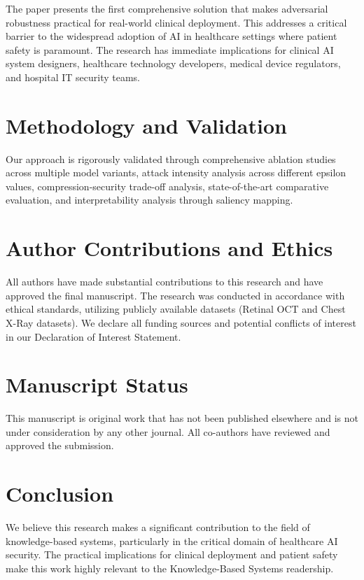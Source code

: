 \documentclass[12pt]{article}
\begin{document}
The paper presents the first comprehensive solution that makes adversarial robustness practical for real-world clinical deployment. This addresses a critical barrier to the widespread adoption of AI in healthcare settings where patient safety is paramount. The research has immediate implications for clinical AI system designers, healthcare technology developers, medical device regulators, and hospital IT security teams.

\section*{Methodology and Validation}

Our approach is rigorously validated through comprehensive ablation studies across multiple model variants, attack intensity analysis across different epsilon values, compression-security trade-off analysis, state-of-the-art comparative evaluation, and interpretability analysis through saliency mapping.

\section*{Author Contributions and Ethics}

All authors have made substantial contributions to this research and have approved the final manuscript. The research was conducted in accordance with ethical standards, utilizing publicly available datasets (Retinal OCT and Chest X-Ray datasets). We declare all funding sources and potential conflicts of interest in our Declaration of Interest Statement.

\section*{Manuscript Status}

This manuscript is original work that has not been published elsewhere and is not under consideration by any other journal. All co-authors have reviewed and approved the submission.

\section*{Conclusion}

We believe this research makes a significant contribution to the field of knowledge-based systems, particularly in the critical domain of healthcare AI security. The practical implications for clinical deployment and patient safety make this work highly relevant to the Knowledge-Based Systems readership.
\end{document}
